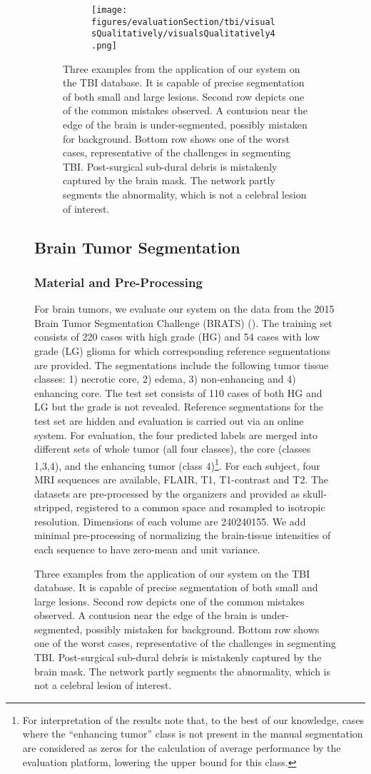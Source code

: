 \documentclass[preprint,authoryear,12pt]{elsarticle}
\newcommand{\quot}[1]{``#1''}
\begin{document}
\begin{figure}[h]
\begin{figure}[!ht]
\centering
\begin{subfigure}[b]{1.0\textwidth}
	\centering
\texttt{[image: figures/evaluationSection/tbi/visualsQualitatively/visualsQualitatively4.png]}
\end{subfigure}
\vspace{-10pt} \caption{Three examples from the application of our system on the TBI database. It is capable of precise segmentation of both small and large lesions. Second row depicts one of the common mistakes observed. A contusion near the edge of the brain is under-segmented, possibly mistaken for background. Bottom row shows one of the worst cases, representative of the challenges in segmenting TBI. Post-surgical sub-dural debris is mistakenly captured by the brain mask. The network partly segments the abnormality, which is not a celebral lesion of interest.}
\label{fig:evalTbiVisualQuality}
\end{figure}
%
 

\subsection{Brain Tumor Segmentation}
\label{subsec:evalBrats}

\subsubsection{Material and Pre-Processing}

For brain tumors, we evaluate our system on the data from the 2015 Brain Tumor Segmentation Challenge (BRATS) (\cite{Menze2014}). The training set consists of 220 cases with high grade (HG) and 54 cases with low grade (LG) glioma for which corresponding reference segmentations are provided. The segmentations include the following tumor tissue classes: 1) necrotic core, 2) edema, 3) non-enhancing and 4) enhancing core. The test set consists of 110 cases of both HG and LG but the grade is not revealed. Reference segmentations for the test set are hidden and evaluation is carried out via an online system. For evaluation, the four predicted labels are merged into different sets of whole tumor (all four classes), the core (classes 1,3,4), and the enhancing tumor (class 4)\footnote{For interpretation of the results note that, to the best of our knowledge, cases where the \quot{enhancing tumor} class is not present in the manual segmentation are considered as zeros for the calculation of average performance by the evaluation platform, lowering the upper bound for this class.}. For each subject, four MRI sequences are available, FLAIR, T1, T1-contrast and T2. The datasets are pre-processed by the organizers and provided as skull-stripped, registered to a common space and resampled to isotropic  resolution. Dimensions of each volume are 240240155. We add minimal pre-processing of normalizing the brain-tissue intensities of each sequence to have zero-mean and unit variance.



\end{figure}
\end{document}
